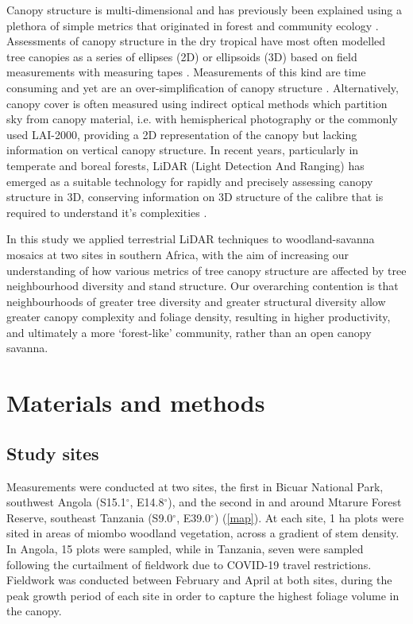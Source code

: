 \documentclass[11pt,a4paper]{article}
\begin{document}
Canopy structure is multi-dimensional and has previously been explained using a plethora of simple metrics that originated in forest and community ecology \citep{}. Assessments of canopy structure in the dry tropical have most often modelled tree canopies as a series of ellipses (2D) or ellipsoids (3D) based on field measurements with measuring tapes \citep{}. Measurements of this kind are time consuming and yet are an over-simplification of canopy structure \citep{}. Alternatively, canopy cover is often measured using indirect optical methods which partition sky from canopy material, i.e. with hemispherical photography or the commonly used LAI-2000, providing a 2D representation of the canopy but lacking information on vertical canopy structure. In recent years, particularly in temperate and boreal forests, LiDAR (Light Detection And Ranging) has emerged as a suitable technology for rapidly and precisely assessing canopy structure in 3D, conserving information on 3D structure of the calibre that is required to understand it's complexities \citep{}.

In this study we applied terrestrial LiDAR techniques to woodland-savanna mosaics at two sites in southern Africa, with the aim of increasing our understanding of how various metrics of tree canopy structure are affected by tree neighbourhood diversity and stand structure. Our overarching contention is that neighbourhoods of greater tree diversity and greater structural diversity allow greater canopy complexity and foliage density, resulting in higher productivity, and ultimately a more `forest-like' community, rather than an open canopy savanna.

\section{Materials and methods}

\subsection{Study sites}

Measurements were conducted at two sites, the first in Bicuar National Park, southwest Angola (S15.1$^\circ$, E14.8$^\circ$), and the second in and around Mtarure Forest Reserve, southeast Tanzania (S9.0$^\circ$, E39.0$^\circ$) (\autoref{map}). At each site, 1 ha plots were sited in areas of miombo woodland vegetation, across a gradient of stem density. In Angola, 15 plots were sampled, while in Tanzania, seven were sampled following the curtailment of fieldwork due to COVID-19 travel restrictions. Fieldwork was conducted between February and April at both sites, during the peak growth period of each site in order to capture the highest foliage volume in the canopy.
\end{document}
